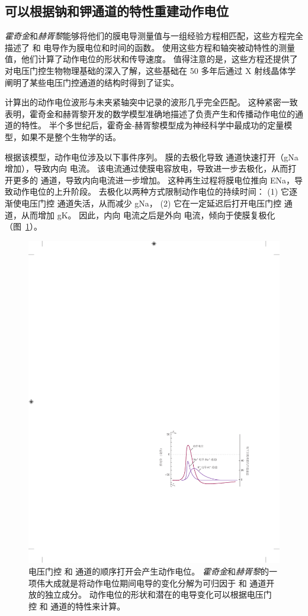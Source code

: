 \subsection{可以根据钠和钾通道的特性重建动作电位}

\textit{霍奇金}和\textit{赫胥黎}能够将他们的膜电导测量值与一组经验方程相匹配，这些方程完全描述了  和  电导作为膜电位和时间的函数。
使用这些方程和轴突被动特性的测量值，他们计算了动作电位的形状和传导速度。
值得注意的是，这些方程还提供了对电压门控生物物理基础的深入了解，这些基础在 50 多年后通过 X 射线晶体学阐明了某些电压门控通道的结构时得到了证实。


计算出的动作电位波形与未夹紧轴突中记录的波形几乎完全匹配。
这种紧密一致表明，霍奇金和赫胥黎开发的数学模型准确地描述了负责产生和传播动作电位的通道的特性。
半个多世纪后，霍奇金-赫胥黎模型成为神经科学中最成功的定量模型，如果不是整个生物学的话。


根据该模型，动作电位涉及以下事件序列。
膜的去极化导致  通道快速打开（gNa 增加），导致内向  电流。
该电流通过使膜电容放电，导致进一步去极化，从而打开更多的  通道，导致内向电流进一步增加。 
这种再生过程将膜电位推向 ENa，导致动作电位的上升阶段。
去极化以两种方式限制动作电位的持续时间：
(1) 它逐渐使电压门控  通道失活，从而减少 gNa，
(2) 它在一定延迟后打开电压门控  通道，从而增加 gK。
因此，内向  电流之后是外向  电流，倾向于使膜复极化（图~\ref{fig:10_7}）。


\begin{figure}[htbp]
	\centering
	\includegraphics[width=0.5\linewidth]{chap10/fig_10_7}
	\caption{电压门控  和  通道的顺序打开会产生动作电位。
		\textit{霍奇金}和\textit{赫胥黎}的一项伟大成就是将动作电位期间电导的变化分解为可归因于  和  通道开放的独立成分。
		动作电位的形状和潜在的电导变化可以根据电压门控  和  通道的特性来计算\cite{hille1978ionic}。}
	\label{fig:10_7}
\end{figure}



